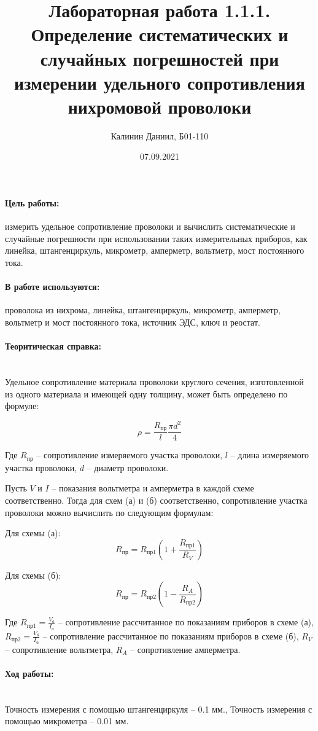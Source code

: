 \documentclass[a4paper, 12pt]{article}
\author{Калинин Даниил, Б01-110}
\date{07.09.2021}
\title{Лабораторная работа 1.1.1. Определение систематических и случайных погрешностей при измерении удельного сопротивления нихромовой проволоки}
\newcommand{\parag}[1]{\paragraph*{#1:}}
\begin{document}
\maketitle

\parag {Цель работы}
измерить удельное сопротивление проволоки и вычислить систематические и случайные погрешности при использовании таких измерительных приборов, как линейка, штангенциркуль, микрометр, амперметр, вольтметр, мост постоянного тока.

\parag {В работе используются}
проволока из нихрома, линейка, штангенциркуль, микрометр, амперметр, вольтметр и мост постоянного тока, источник ЭДС, ключ и реостат.

\parag {Теоритическая справка} ~\\
Удельное сопротивление материала проволоки круглого сечения, изготовленной из одного материала и имеющей одну толщину, может быть определено по формуле:

\begin{equation} \label{eq:1}
    \rho = \frac{R_{пр}}{l}  \frac{\pi d^2}{4}
\end{equation}

Где $R_{пр}$    -- сопротивление измеряемого участка проволоки,
    $l$         -- длина измеряемого участка проволоки,
    $d$         -- диаметр проволоки.

Пусть $V$ и $I$ -- показания вольтметра и амперметра в каждой схеме соответственно. Тогда для схем (а) и (б) соответственно, сопротивление участка проволоки можно вычислить по следующим формулам:

Для схемы (а):
\begin{equation} \label{eq:2}
    R_{пр} =  R_{пр1} (1 + \frac{R_{пр1}}{R_{V}})
\end{equation}

Для схемы (б):
\begin{equation} \label{eq:3}
    R_{пр} =  R_{пр2} (1 - \frac{R_{A}}{R_{пр2}})
\end{equation}

Где $R_{пр1} = \frac{V_a}{I_a}$ -- сопротивление рассчитанное по       показаниям приборов в схеме (а),
    $R_{пр2} = \frac{V_б}{I_б}$ -- сопротивление рассчитанное по       показаниям приборов в схеме (б),
    $R_V$ -- сопротивление вольтметра,
    $R_A$ -- сопротивление амперметра.

\parag {Ход работы} ~\\
Точность измерения с помощью штангенциркуля -- 0.1 мм., Точность измерения с помощью микрометра -- 0.01 мм.\\
\end{document}
